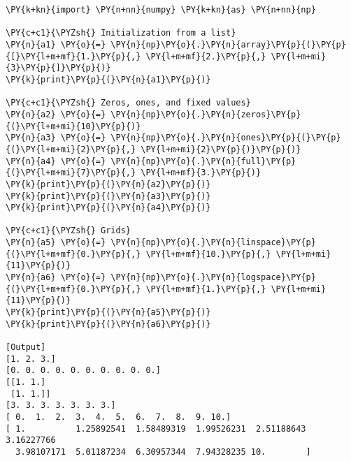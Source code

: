 \begin{Verbatim}[label=\makebox{\url{https://github.com/lucabaldini/cmepda/tree/master/slides/latex/snippets/numpy\_arrays.py}},commandchars=\\\{\}]
\PY{k+kn}{import} \PY{n+nn}{numpy} \PY{k+kn}{as} \PY{n+nn}{np}

\PY{c+c1}{\PYZsh{} Initialization from a list}
\PY{n}{a1} \PY{o}{=} \PY{n}{np}\PY{o}{.}\PY{n}{array}\PY{p}{(}\PY{p}{[}\PY{l+m+mf}{1.}\PY{p}{,} \PY{l+m+mf}{2.}\PY{p}{,} \PY{l+m+mi}{3}\PY{p}{]}\PY{p}{)}
\PY{k}{print}\PY{p}{(}\PY{n}{a1}\PY{p}{)}

\PY{c+c1}{\PYZsh{} Zeros, ones, and fixed values}
\PY{n}{a2} \PY{o}{=} \PY{n}{np}\PY{o}{.}\PY{n}{zeros}\PY{p}{(}\PY{l+m+mi}{10}\PY{p}{)}
\PY{n}{a3} \PY{o}{=} \PY{n}{np}\PY{o}{.}\PY{n}{ones}\PY{p}{(}\PY{p}{(}\PY{l+m+mi}{2}\PY{p}{,} \PY{l+m+mi}{2}\PY{p}{)}\PY{p}{)}
\PY{n}{a4} \PY{o}{=} \PY{n}{np}\PY{o}{.}\PY{n}{full}\PY{p}{(}\PY{l+m+mi}{7}\PY{p}{,} \PY{l+m+mf}{3.}\PY{p}{)}
\PY{k}{print}\PY{p}{(}\PY{n}{a2}\PY{p}{)}
\PY{k}{print}\PY{p}{(}\PY{n}{a3}\PY{p}{)}
\PY{k}{print}\PY{p}{(}\PY{n}{a4}\PY{p}{)}

\PY{c+c1}{\PYZsh{} Grids}
\PY{n}{a5} \PY{o}{=} \PY{n}{np}\PY{o}{.}\PY{n}{linspace}\PY{p}{(}\PY{l+m+mf}{0.}\PY{p}{,} \PY{l+m+mf}{10.}\PY{p}{,} \PY{l+m+mi}{11}\PY{p}{)}
\PY{n}{a6} \PY{o}{=} \PY{n}{np}\PY{o}{.}\PY{n}{logspace}\PY{p}{(}\PY{l+m+mf}{0.}\PY{p}{,} \PY{l+m+mf}{1.}\PY{p}{,} \PY{l+m+mi}{11}\PY{p}{)}
\PY{k}{print}\PY{p}{(}\PY{n}{a5}\PY{p}{)}
\PY{k}{print}\PY{p}{(}\PY{n}{a6}\PY{p}{)}

[Output]
[1. 2. 3.]
[0. 0. 0. 0. 0. 0. 0. 0. 0. 0.]
[[1. 1.]
 [1. 1.]]
[3. 3. 3. 3. 3. 3. 3.]
[ 0.  1.  2.  3.  4.  5.  6.  7.  8.  9. 10.]
[ 1.          1.25892541  1.58489319  1.99526231  2.51188643  3.16227766
  3.98107171  5.01187234  6.30957344  7.94328235 10.        ]
\end{Verbatim}